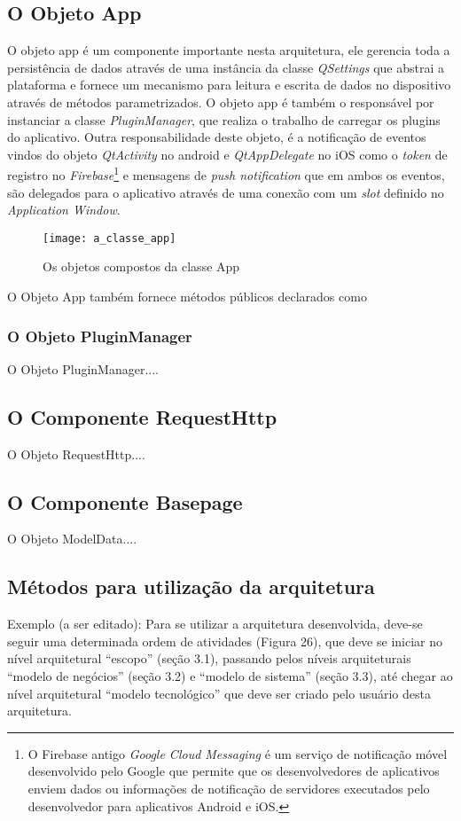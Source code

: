 \subsection{O Objeto App}\label{sec:solucao-desenvolvida}
O objeto app é um componente importante nesta arquitetura, ele gerencia toda a persistência de dados através de uma instância da classe \textit{QSettings} que abstrai a plataforma e fornece um mecanismo para leitura e escrita de dados no dispositivo através de métodos parametrizados. O objeto app é também o responsável por instanciar a classe \textit{PluginManager}, que realiza o trabalho de carregar os plugins do aplicativo. Outra responsabilidade deste objeto, é a notificação de eventos vindos do objeto \textit{QtActivity} no android e \textit{QtAppDelegate} no iOS como o \textit{token} de registro no \textit{Firebase}\footnote{O Firebase antigo \textit{Google Cloud Messaging} é um serviço de notificação móvel desenvolvido pelo Google que permite que os desenvolvedores de aplicativos enviem dados ou informações de notificação de servidores executados pelo desenvolvedor para aplicativos Android e iOS.} e mensagens de \textit{push notification} que em ambos os eventos, são delegados para o aplicativo através de uma conexão com um \textit{slot} definido no \textit{Application Window}.

\begin{figure}[h]
	\texttt{[image: a\_classe\_app]}
	\centering
	\caption{Os objetos compostos da classe App}
\end{figure}

O Objeto App também fornece métodos públicos declarados como 


\subsubsection{O Objeto PluginManager}\label{sec:solucao-desenvolvida}
O Objeto PluginManager....


\subsection{O Componente RequestHttp}\label{sec:solucao-desenvolvida}
O Objeto RequestHttp....

\subsection{O Componente Basepage}\label{sec:solucao-desenvolvida}
O Objeto ModelData....


\subsection{Métodos para utilização da arquitetura}
Exemplo (a ser editado): Para se utilizar a arquitetura desenvolvida, deve-se seguir uma determinada ordem de atividades (Figura 26), que deve se iniciar no nível arquitetural “escopo” (seção 3.1), passando pelos níveis arquiteturais “modelo de negócios” (seção 3.2) e “modelo de sistema” (seção 3.3), até chegar ao nível arquitetural “modelo tecnológico” que deve ser criado pelo usuário desta arquitetura.